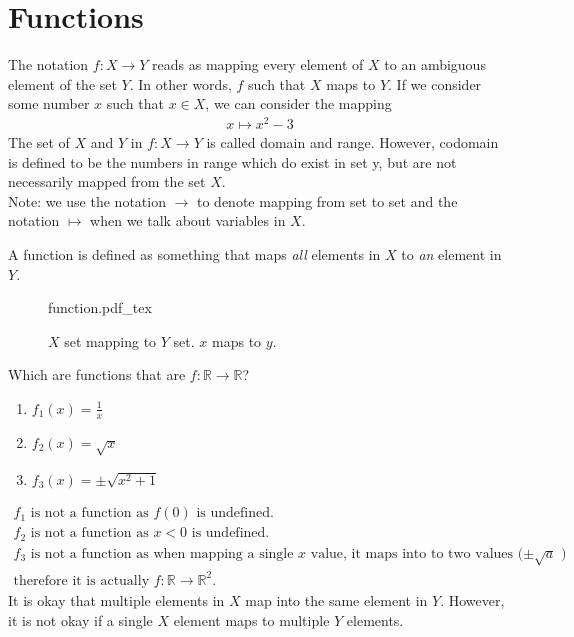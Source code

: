 \documentclass[a4paper]{article}
\newcommand{\incfig}[2][1]{%
	\def\svgwidth{#1\columnwidth}
	{#2.pdf_tex}
}
\theoremstyle{plain}
\theoremstyle{definition}
\newtheorem{defn}{Definition}[section]
\newtheorem{exmp}{Example}[section]
\theoremstyle{remark}
\begin{document}
\section{Functions} 
\begin{tcolorbox}[colback=black!3!white,colframe=black!60!white,title=\begin{defn}Function Notation \label{Function Notation}\end{defn}] 
The notation $f:X \to Y$ reads as mapping every element of $X$ to an ambiguous element of the set $Y$. In other words, $f$ such that $X$ maps to  $Y$. If we consider some number $x$ such that $x \in X$, we can consider the mapping \\ \begin{align*} x \mapsto x^2-3 \end{align*} The set of $X$ and $Y$ in $f: X \to  Y$ is called domain and range. However, codomain is defined to be the numbers in range which do exist in set y, but are not necessarily mapped from the set $X$. \\ 
Note: we use the notation $\to $ to denote mapping from set to set and the notation $\mapsto$ when we talk about variables in $X$.  
\end{tcolorbox} 
\begin{tcolorbox}[colback=black!3!white,colframe=black!60!white,title=\begin{defn}Definition of a function\label{Definition}\end{defn}] 
A function is defined as something that maps \emph{all} elements in $X$ to \emph{an} element in $Y$.  
\begin{figure}[H] 
	\centering 
	\incfig{function} 
	\caption{$X$ set mapping to $Y$ set. $x$ maps to $y$.} 
	\label{fig:function} 
\end{figure} 
\end{tcolorbox} 
\begin{tcolorbox}[colback=black!3!white,colframe=black!60!white,title=\begin{exmp}Question 1 \label{Question 1}\end{exmp}] 
Which are functions that are $f:\mathbb{R} \to  \mathbb{R}$?  
\begin{enumerate} 
	\item $f_1(x)=\frac{1}{x}$ 
	\item $f_2(x)=\sqrt{x} $ 
	\item $f_3(x)=\pm\sqrt{x^2+1} $ 
\end{enumerate} 
\begin{align} 
	\text{$f_1$ is not a function as $f\left( 0 \right)$ is undefined.} \\ 
	\text{$f_2$ is not a function as $x<0$ is undefined.} \\ 
	\text{$f_3$ is not a function as when mapping a single $x$ value, it maps into to two values ($\pm\sqrt{a} $ )}\\
	\text{therefore it is actually $f:\mathbb{R}\to \mathbb{R}^2$.} 
\end{align} 
It is okay that multiple elements in $X$ map into the same element in $Y$. However, it is not okay if a single $X$ element maps to multiple $Y$ elements.  
		\end{tcolorbox} 
\end{document}
